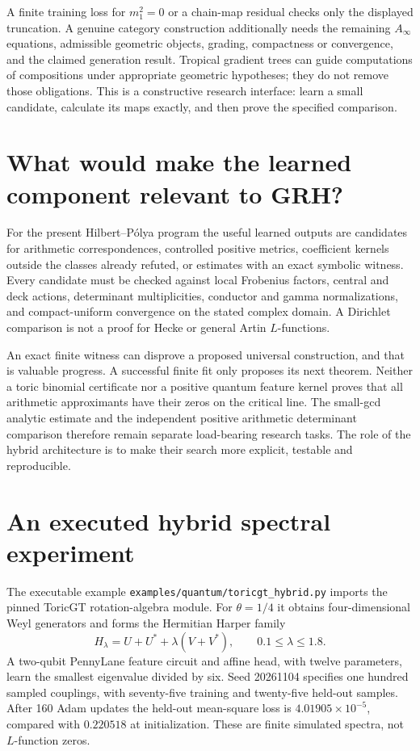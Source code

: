 A finite training loss for $m_1^2=0$ or a chain-map residual checks only
the displayed truncation. A genuine category construction additionally
needs the remaining $A_\infty$ equations, admissible geometric objects,
grading, compactness or convergence, and the claimed generation result.
Tropical gradient trees can guide computations of compositions under
appropriate geometric hypotheses; they do not remove those obligations.
This is a constructive research interface: learn a small candidate,
calculate its maps exactly, and then prove the specified comparison.

\section{What would make the learned component relevant to GRH?}
For the present Hilbert--P\'olya program the useful learned outputs are
candidates for arithmetic correspondences, controlled positive metrics,
coefficient kernels outside the classes already refuted, or estimates
with an exact symbolic witness. Every candidate must be checked against
local Frobenius factors, central and deck actions, determinant
multiplicities, conductor and gamma normalizations, and compact-uniform
convergence on the stated complex domain. A Dirichlet comparison is not
a proof for Hecke or general Artin $L$-functions.

An exact finite witness can disprove a proposed universal construction,
and that is valuable progress. A successful finite fit only proposes its
next theorem. Neither a toric binomial certificate nor a positive quantum
feature kernel proves that all arithmetic approximants have their zeros
on the critical line. The small-gcd analytic estimate and the independent
positive arithmetic determinant comparison therefore remain separate
load-bearing research tasks. The role of the hybrid architecture is to
make their search more explicit, testable and reproducible.

\section{An executed hybrid spectral experiment}
The executable example \texttt{examples/quantum/toricgt\_hybrid.py} imports the pinned ToricGT rotation-algebra module. For $\theta=1/4$ it obtains four-dimensional Weyl generators and forms the Hermitian Harper family
\[
 H_\lambda=U+U^*+\lambda(V+V^*),\qquad 0.1\le\lambda\le1.8.
\]
A two-qubit PennyLane feature circuit and affine head, with twelve parameters, learn the smallest eigenvalue divided by six. Seed 20261104 specifies one hundred sampled couplings, with seventy-five training and twenty-five held-out samples. After 160 Adam updates the held-out mean-square loss is $4.01905\times10^{-5}$, compared with $0.220518$ at initialization. These are finite simulated spectra, not $L$-function zeros.

